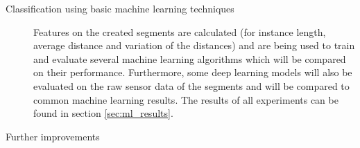 \begin{description}
\item[Classification using basic machine learning techniques] Features on the created segments are calculated (for instance length, average distance and variation of the distances) and are being used to train and evaluate several machine learning algorithms which will be compared on their performance. Furthermore, some deep learning models will also be evaluated on the raw sensor data of the segments and will be compared to common machine learning results. The results of all experiments can be found in section  \ref{sec:ml_results}.

\item[Further improvements] 

\end{description}






